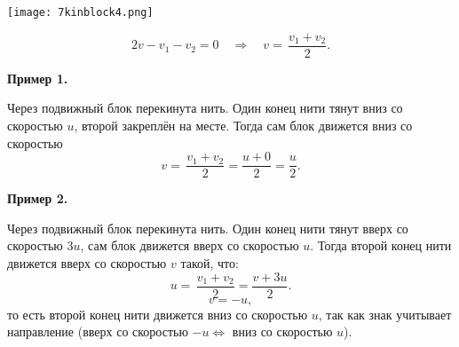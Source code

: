 \documentclass[12pt, a4paper]{article}%
\begin{document}
\begin{center}
\texttt{[image: 7kinblock4.png]}
\label{fig:mpr}
\end{center}

\[
2v - v_1 - v_2 = 0
\quad\Longrightarrow\quad
v = \,\frac{v_1 + v_2}{2}.
\]  





\textbf{Пример 1.}

Через подвижный блок перекинута нить. Один конец нити тянут вниз со скоростью $u$, второй закреплён на месте.
Тогда сам блок движется вниз со скоростью 
\[
v = \,\frac{v_1+v_2}{2} = \frac{u+0}{2} = \frac{u}{2}.
\]  


\textbf{Пример 2.}

Через подвижный блок перекинута нить. Один конец нити тянут вверх со скоростью $3u$, сам блок движется вверх со скоростью $u$.
Тогда второй конец нити движется вверх со скоростью $v$ такой, что:
\[
u = \,\frac{v_1+v_2}{2} = \frac{v+3u}{2}.
\]  
\[
v = -u,
\]
то есть второй конец нити движется вниз со скоростью $u$, так как знак учитывает направление (вверх со скоростью $-u \Longleftrightarrow$ вниз со скоростью $u$).
\end{document}
